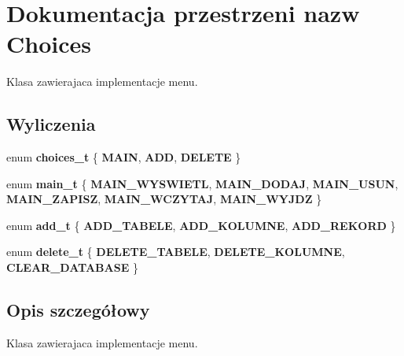 \hypertarget{namespace_choices}{}\section{Dokumentacja przestrzeni nazw Choices}
\label{namespace_choices}


Klasa zawierajaca implementacje menu.  


\subsection*{Wyliczenia}
\begin{DoxyCompactItemize}
\item 
\mbox{\label{namespace_choices_a9d36288218bdcf0e521bdc12b7a14e75}} 
enum {\bfseries choices\+\_\+t} \{ {\bfseries M\+A\+IN}, 
{\bfseries A\+DD}, 
{\bfseries D\+E\+L\+E\+TE}
 \}
\item 
\mbox{\label{namespace_choices_aff65bae6dc0f84c1c0b5a3005a6e2e42}} 
enum {\bfseries main\+\_\+t} \{ \newline
{\bfseries M\+A\+I\+N\+\_\+\+W\+Y\+S\+W\+I\+E\+TL}, 
{\bfseries M\+A\+I\+N\+\_\+\+D\+O\+D\+AJ}, 
{\bfseries M\+A\+I\+N\+\_\+\+U\+S\+UN}, 
{\bfseries M\+A\+I\+N\+\_\+\+Z\+A\+P\+I\+SZ}, 
\newline
{\bfseries M\+A\+I\+N\+\_\+\+W\+C\+Z\+Y\+T\+AJ}, 
{\bfseries M\+A\+I\+N\+\_\+\+W\+Y\+J\+DZ}
 \}
\item 
\mbox{\label{namespace_choices_a47b2e45bc7174afab91e85f59e554968}} 
enum {\bfseries add\+\_\+t} \{ {\bfseries A\+D\+D\+\_\+\+T\+A\+B\+E\+LE}, 
{\bfseries A\+D\+D\+\_\+\+K\+O\+L\+U\+M\+NE}, 
{\bfseries A\+D\+D\+\_\+\+R\+E\+K\+O\+RD}
 \}
\item 
\mbox{\label{namespace_choices_a1b0931b7d2530034b6fdbe42bc5465d0}} 
enum {\bfseries delete\+\_\+t} \{ {\bfseries D\+E\+L\+E\+T\+E\+\_\+\+T\+A\+B\+E\+LE}, 
{\bfseries D\+E\+L\+E\+T\+E\+\_\+\+K\+O\+L\+U\+M\+NE}, 
{\bfseries C\+L\+E\+A\+R\+\_\+\+D\+A\+T\+A\+B\+A\+SE}
 \}
\end{DoxyCompactItemize}


\subsection{Opis szczegółowy}
Klasa zawierajaca implementacje menu. 